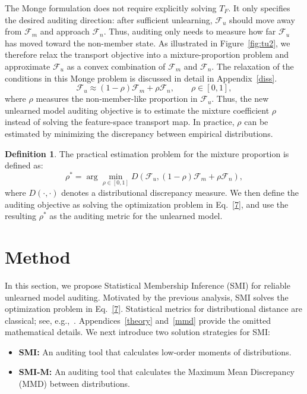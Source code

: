 \documentclass{article}
\theoremstyle{plain}
\theoremstyle{definition}
\newtheorem{definition}[theorem]{Definition}
\theoremstyle{remark}
\begin{document}
The Monge formulation does not require explicitly solving $T_F$. It only specifies the desired auditing direction: after sufficient unlearning, $\mathcal F_u$ should move away from $\mathcal F_m$ and approach $\mathcal F_n$. Thus, auditing only needs to measure how far $\mathcal F_u$ has moved toward the non-member state. As illustrated in Figure~\ref{fig:tu2}, we therefore relax the transport objective into a mixture-proportion problem and approximate $\mathcal F_u$ as a convex combination of $\mathcal F_m$ and $\mathcal F_n$. The relaxation of the conditions in this Monge problem is discussed in detail in Appendix~\ref{diss}.
\begin{equation}
    \mathcal F_u
    \approx
    (1-\rho)\mathcal F_m+\rho\mathcal F_n,
    \qquad \rho\in[0,1],
\end{equation}
where $\rho$ measures the non-member-like proportion in $\mathcal F_u$. Thus, the new unlearned model auditing objective is to estimate the mixture coefficient $\rho$ instead of solving the feature-space transport map. In practice, $\rho$ can be estimated by minimizing the discrepancy between empirical distributions.
\begin{definition}
The practical estimation problem for the mixture proportion is defined as:
\begin{equation}
    \rho^*
    =
    \arg\min_{\rho\in[0,1]}
    D\left(
    \mathcal F_u,
    (1-\rho)\mathcal F_m+\rho\mathcal F_n
    \right), \label{7}
\end{equation}
where $D(\cdot,\cdot)$ denotes a distributional discrepancy measure. We then define the auditing objective as solving the optimization problem in Eq.~\eqref{7}, and use the resulting $\rho^*$ as the auditing metric for the unlearned model.
\end{definition}
\section{Method}
In this section, we propose Statistical Membership Inference (SMI) for reliable unlearned model auditing. Motivated by the previous analysis, SMI solves the optimization problem in Eq.~\eqref{7}. Statistical metrics for distributional distance are classical; see, e.g.,~\cite{duliang1,duliang2,duliang3}. Appendices~\ref{theory} and~\ref{mmd} provide the omitted mathematical details. We next introduce two solution strategies for SMI:
\begin{itemize}
\item \textbf{SMI:} An auditing tool that calculates low-order moments of distributions.
\item \textbf{SMI-M:} An auditing tool that calculates the Maximum Mean Discrepancy (MMD) between distributions.
\end{itemize}
\end{document}
